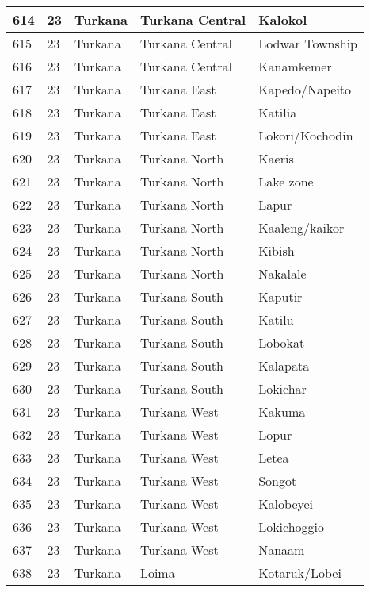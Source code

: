 \begin{table}[!ht]
\begin{tabular}{|l|l|l|l|l|}
        614 & 23 & Turkana & Turkana Central & Kalokol \\ \hline
        615 & 23 & Turkana & Turkana Central & Lodwar Township \\ \hline
        616 & 23 & Turkana & Turkana Central & Kanamkemer \\ \hline
        617 & 23 & Turkana & Turkana East & Kapedo/Napeito \\ \hline
        618 & 23 & Turkana & Turkana East & Katilia \\ \hline
        619 & 23 & Turkana & Turkana East & Lokori/Kochodin \\ \hline
        620 & 23 & Turkana & Turkana North & Kaeris \\ \hline
        621 & 23 & Turkana & Turkana North & Lake zone \\ \hline
        622 & 23 & Turkana & Turkana North & Lapur \\ \hline
        623 & 23 & Turkana & Turkana North & Kaaleng/kaikor \\ \hline
        624 & 23 & Turkana & Turkana North & Kibish \\ \hline
        625 & 23 & Turkana & Turkana North & Nakalale \\ \hline
        626 & 23 & Turkana & Turkana South & Kaputir \\ \hline
        627 & 23 & Turkana & Turkana South & Katilu \\ \hline
        628 & 23 & Turkana & Turkana South & Lobokat \\ \hline
        629 & 23 & Turkana & Turkana South & Kalapata \\ \hline
        630 & 23 & Turkana & Turkana South & Lokichar \\ \hline
        631 & 23 & Turkana & Turkana West & Kakuma \\ \hline
        632 & 23 & Turkana & Turkana West & Lopur \\ \hline
        633 & 23 & Turkana & Turkana West & Letea \\ \hline
        634 & 23 & Turkana & Turkana West & Songot \\ \hline
        635 & 23 & Turkana & Turkana West & Kalobeyei \\ \hline
        636 & 23 & Turkana & Turkana West & Lokichoggio \\ \hline
        637 & 23 & Turkana & Turkana West & Nanaam \\ \hline
        638 & 23 & Turkana & Loima & Kotaruk/Lobei \\ \hline

\end{tabular}
\end{table}
